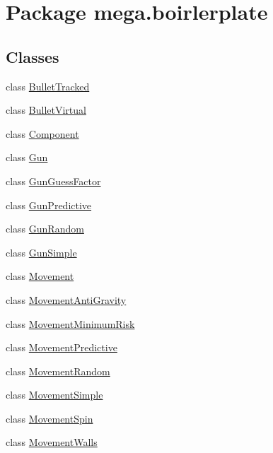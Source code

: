 \hypertarget{namespacemega_1_1boirlerplate}{}\section{Package mega.\+boirlerplate}
\label{namespacemega_1_1boirlerplate}
\subsection*{Classes}
\begin{DoxyCompactItemize}
\item 
class \hyperlink{classmega_1_1boirlerplate_1_1_bullet_tracked}{Bullet\+Tracked}
\item 
class \hyperlink{classmega_1_1boirlerplate_1_1_bullet_virtual}{Bullet\+Virtual}
\item 
class \hyperlink{classmega_1_1boirlerplate_1_1_component}{Component}
\item 
class \hyperlink{classmega_1_1boirlerplate_1_1_gun}{Gun}
\item 
class \hyperlink{classmega_1_1boirlerplate_1_1_gun_guess_factor}{Gun\+Guess\+Factor}
\item 
class \hyperlink{classmega_1_1boirlerplate_1_1_gun_predictive}{Gun\+Predictive}
\item 
class \hyperlink{classmega_1_1boirlerplate_1_1_gun_random}{Gun\+Random}
\item 
class \hyperlink{classmega_1_1boirlerplate_1_1_gun_simple}{Gun\+Simple}
\item 
class \hyperlink{classmega_1_1boirlerplate_1_1_movement}{Movement}
\item 
class \hyperlink{classmega_1_1boirlerplate_1_1_movement_anti_gravity}{Movement\+Anti\+Gravity}
\item 
class \hyperlink{classmega_1_1boirlerplate_1_1_movement_minimum_risk}{Movement\+Minimum\+Risk}
\item 
class \hyperlink{classmega_1_1boirlerplate_1_1_movement_predictive}{Movement\+Predictive}
\item 
class \hyperlink{classmega_1_1boirlerplate_1_1_movement_random}{Movement\+Random}
\item 
class \hyperlink{classmega_1_1boirlerplate_1_1_movement_simple}{Movement\+Simple}
\item 
class \hyperlink{classmega_1_1boirlerplate_1_1_movement_spin}{Movement\+Spin}
\item 
class \hyperlink{classmega_1_1boirlerplate_1_1_movement_walls}{Movement\+Walls}
\item 

\end{DoxyCompactItemize}
